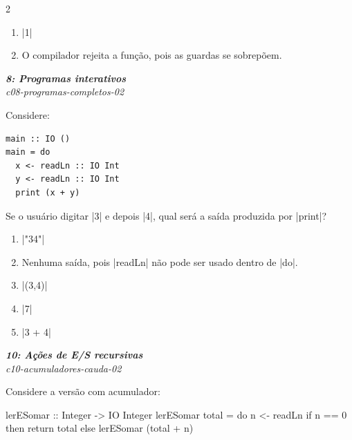\documentclass[a4paper,10pt,brazil]{article}
\begin{document}
\begin{multicols}{2}
\begin{enumerate}
  \item \haskellinline|1|

  \item O compilador rejeita a função, pois as guardas se sobrepõem.


\end{enumerate}

\begin{flushright}
  \footnotesize
  \textit{\textbf{8: Programas interativos}}\\
  \textit{c08-programas-completos-02}\\

\end{flushright}
Considere:

\begin{verbatim}
main :: IO ()
main = do
  x <- readLn :: IO Int
  y <- readLn :: IO Int
  print (x + y)
\end{verbatim}

Se o usuário digitar \haskellinline|3| e depois \haskellinline|4|, qual será a saída produzida por \haskellinline|print|?

\begin{enumerate}
  \item \haskellinline|"34"|

  \item Nenhuma saída, pois \haskellinline|readLn| não pode ser usado dentro de \haskellinline|do|.

  \item \haskellinline|(3,4)|

  \item \haskellinline|7|

  \item \haskellinline|3 + 4|


\end{enumerate}

\begin{flushright}
  \footnotesize
  \textit{\textbf{10: Ações de E/S recursivas}}\\
  \textit{c10-acumuladores-cauda-02}\\

\end{flushright}
Considere a versão com acumulador:

\begin{haskellcode}
lerESomar :: Integer -> IO Integer
lerESomar total = do
  n <- readLn
  if n == 0
    then return total
    else lerESomar (total + n)
\end{haskellcode}


\end{multicols}
\end{document}
